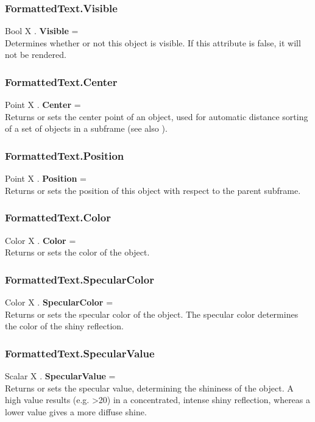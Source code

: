 \subsubsection{FormattedText.Visible \label{F:FormattedText:Visible}}
Bool X . \textbf{Visible} = \\
Determines whether or not this object is visible. If this attribute is false, it will not be rendered.

\subsubsection{FormattedText.Center \label{F:FormattedText:Center}}
Point X . \textbf{Center} = \\
Returns or sets the center point of an object, used for automatic distance sorting of a set of objects in a subframe (see also ).

\subsubsection{FormattedText.Position \label{F:FormattedText:Position}}
Point X . \textbf{Position} = \\
Returns or sets the position of this object with respect to the parent subframe.

\subsubsection{FormattedText.Color \label{F:FormattedText:Color}}
Color X . \textbf{Color} = \\
Returns or sets the color of the object.

\subsubsection{FormattedText.SpecularColor \label{F:FormattedText:SpecularColor}}
Color X . \textbf{SpecularColor} = \\
Returns or sets the specular color of the object. The specular color determines the color of the shiny reflection.

\subsubsection{FormattedText.SpecularValue \label{F:FormattedText:SpecularValue}}
Scalar X . \textbf{SpecularValue} = \\
Returns or sets the specular value, determining the shininess of the object. A high value results (e.g. >20) in a concentrated, intense shiny reflection, whereas a lower value gives a more diffuse shine.

